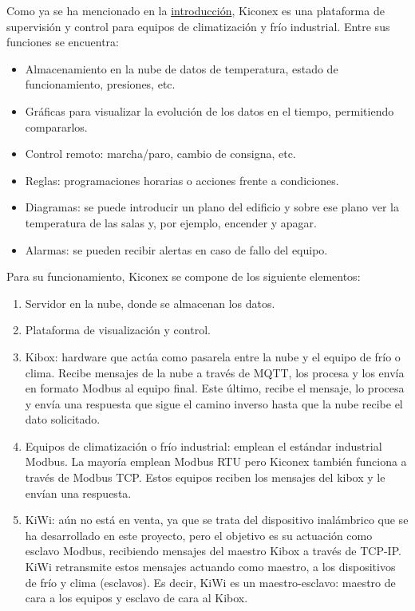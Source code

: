 Como ya se ha mencionado en la \hyperref[chap:intro]{introducción}, Kiconex es una plataforma de supervisión y control para equipos de climatización y frío industrial. Entre sus funciones se encuentra:
\begin{itemize}
  \item Almacenamiento en la nube de datos de temperatura, estado de funcionamiento, presiones, etc.  
  \item Gráficas para visualizar la evolución de los datos en el tiempo, permitiendo compararlos. 
  \item Control remoto: marcha/paro, cambio de consigna, etc.
  \item Reglas: programaciones horarias o acciones frente a condiciones. 
  \item Diagramas: se puede introducir un plano del edificio y sobre ese plano ver la temperatura de las salas y, por ejemplo, encender y apagar.
  \item Alarmas: se pueden recibir alertas en caso de fallo del equipo. 
\end{itemize}
Para su funcionamiento, Kiconex se compone de los siguiente elementos:
\begin{enumerate}
  \item Servidor en la nube, donde se almacenan los datos.
  \item Plataforma de visualización y control.  
  \item Kibox: hardware que actúa como pasarela entre la nube y el equipo de frío o clima. Recibe mensajes de la nube a través de MQTT, los procesa y los envía en formato Modbus al equipo final. Este último, recibe el mensaje, lo procesa y envía una respuesta que sigue el camino inverso hasta que la nube recibe el dato solicitado. 
  \item Equipos de climatización o frío industrial: emplean el estándar industrial Modbus. La mayoría emplean Modbus RTU pero Kiconex también funciona a través de Modbus TCP. Estos equipos reciben los mensajes del kibox y le envían una respuesta.
  \item KiWi: aún no está en venta, ya que se trata del dispositivo inalámbrico que se ha desarrollado en este proyecto, pero el objetivo es su actuación como esclavo Modbus, recibiendo mensajes del maestro Kibox a través de TCP-IP. KiWi retransmite estos mensajes actuando como maestro, a los dispositivos de frío y clima (esclavos). Es decir, KiWi es un maestro-esclavo: maestro de cara a los equipos y esclavo de cara al Kibox.
\end{enumerate}

